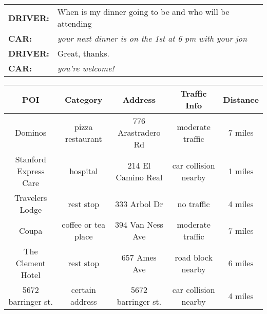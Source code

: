 \documentclass[11pt,a4paper]{article}
\begin{document}
\begin{figure*}
  \vspace{3mm}


  \begin{tabular}{ll}
    \bf DRIVER: & When is my dinner going to be and who will be attending\\
    \bf CAR: & \emph{your next dinner is on the 1st at 6 pm with your jon} \\
    \bf DRIVER: & Great, thanks.\\ 
    \bf CAR: & \emph{you're welcome!}\\
  \end{tabular}


  \vspace{6mm}

  \small
\centering
  \begin{tabular}{|c|c|c|c|c|}
  \hline
  \bf POI& \bf Category & \bf Address & \bf Traffic Info& \bf Distance \\ \hline
  Dominos & pizza restaurant & 776 Arastradero Rd & moderate traffic & 7 miles \\ 
  Stanford Express Care & hospital & 214 El Camino Real & car collision nearby & 1 miles \\
  Travelers Lodge & rest stop & 333 Arbol Dr & no traffic & 4 miles \\ 
  Coupa & coffee or tea place & 394 Van Ness Ave & moderate traffic & 7 miles \\ 
  The Clement Hotel & rest stop & 657 Ames Ave & road block nearby & 6 miles \\
  5672 barringer st. & certain address & 5672 barringer st. & car collision nearby & 4 miles \\
  \hline
  \end{tabular}

  \vspace{3mm}



\end{figure*}
\end{document}
